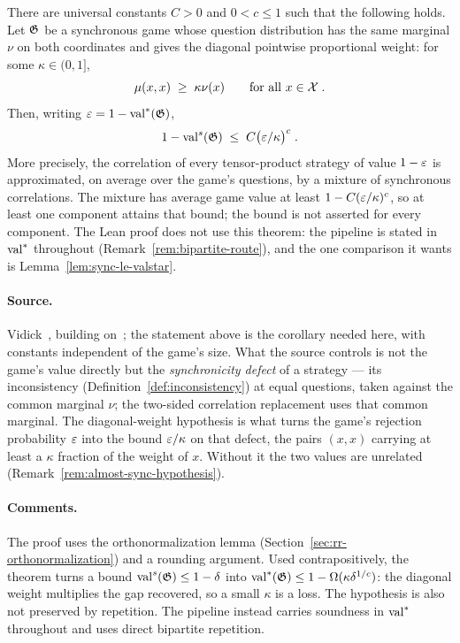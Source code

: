 \begin{theorem}
\label{thm:almost-sync}
There are universal constants $C > 0$ and $0 < c \leq 1$ such that the following holds.
Let $\mathfrak{G}$ be a synchronous game whose question distribution has the same marginal
$\nu$ on both coordinates and gives the diagonal pointwise proportional weight:
for some $\kappa \in (0, 1]$,
\begin{equation*}
  \mu(x,x) \;\geq\; \kappa\nu(x) \qquad \text{for all } x \in \mathcal{X}\;.
\end{equation*}
Then, writing $\varepsilon = 1 - \mathrm{val}^*(\mathfrak{G})$,
\begin{equation*}
  1 - \mathrm{val}^{s}(\mathfrak{G}) \;\leq\; C \bigl( \varepsilon / \kappa \bigr)^{c}\;.
\end{equation*}
More precisely, the correlation of every tensor-product strategy of value $1 - \varepsilon$
is approximated, on average over the game's questions, by a mixture of synchronous
correlations. The mixture has average game value at least $1 - C(\varepsilon/\kappa)^c$,
so at least one component attains that bound; the bound is not asserted for every component.
The Lean proof does not use this theorem: the pipeline is stated in $\mathrm{val}^*$ throughout
(Remark~\ref{rem:bipartite-route}), and the one comparison it wants is
Lemma~\ref{lem:sync-le-valstar}.
\end{theorem}

\paragraph{Source.} Vidick~\cite{Vid22}, building on~\cite{KPS18,PSSTW16}; the
statement above is the corollary needed here, with constants independent of the game's
size. What the source controls is not the game's value directly but the
\emph{synchronicity defect} of a strategy --- its inconsistency
(Definition~\ref{def:inconsistency}) at equal questions, taken against the common
marginal $\nu$; the two-sided correlation replacement uses that common marginal.
The diagonal-weight hypothesis is what turns the game's rejection
probability $\varepsilon$ into the bound $\varepsilon/\kappa$ on that defect, the pairs $(x,x)$ carrying
at least a $\kappa$ fraction of the weight of $x$. Without it the two values are unrelated
(Remark~\ref{rem:almost-sync-hypothesis}).

\paragraph{Comments.} The proof uses the orthonormalization
lemma (Section~\ref{sec:rr-orthonormalization}) and a rounding argument. Used
contrapositively, the theorem turns a
bound $\mathrm{val}^{s}(\mathfrak{G}) \leq 1 - \delta$ into $\mathrm{val}^*(\mathfrak{G}) \leq 1 - \Omega(\kappa
\delta^{1/c})$: the diagonal weight multiplies the gap recovered, so a small $\kappa$ is a
loss. The hypothesis is also not preserved by repetition. The pipeline instead carries
soundness in $\mathrm{val}^*$ throughout and uses direct bipartite repetition.

